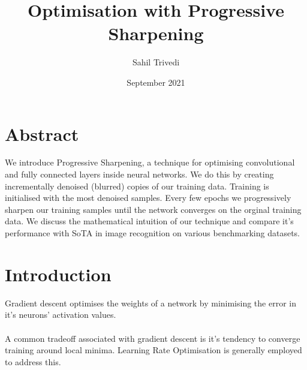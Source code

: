 \documentclass[12pt]{article}
\date{September 2021}
\title{Optimisation with Progressive Sharpening}
\author{Sahil Trivedi}
\begin{document}
	\maketitle
	
	\begin{multicols}{2}
		\section{Abstract}
		We introduce Progressive Sharpening, a technique for optimising convolutional and fully connected layers inside neural networks. We do this by creating incrementally denoised (blurred) copies of our training data. Training is initialised with the most denoised samples. Every few epochs we progressively sharpen our training samples until the network converges on the orginal training data. We discuss the mathematical intuition of our technique and compare it's performance with SoTA in image recognition on various benchmarking datasets. 
		
		
		\columnbreak
		
		\section{Introduction}
		Gradient descent optimises the weights of a network by minimising the error in it's neurons' activation values.
		\\\\
		A common tradeoff associated with gradient descent is it's tendency to converge training around local minima. Learning Rate Optimisation is generally employed to address this.
	\end{multicols}
	
	
	
	
	
\end{document}
